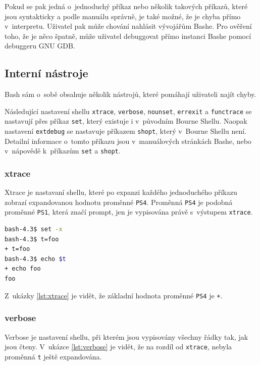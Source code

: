 \documentclass[thesis=M,czech]{FITthesis}[2012/06/26]
\begin{document}
Pokud se pak jedná o~jednoduchý příkaz nebo několik takových příkazů, které jsou syntakticky a podle manuálu správně, je také možné, že je chyba přímo v~interpretu. Uživatel pak může chování nahlásit vývojářům Bashe. Pro ověření toho, že je něco špatně, může uživatel debuggovat přímo instanci Bashe pomocí debuggeru GNU GDB.



%
\subsection{Interní nástroje}

Bash sám o~sobě obsahuje několik nástrojů, které pomáhají uživateli najít chyby.

Následující nastavení shellu \texttt{xtrace}, \texttt{verbose}, \texttt{nounset}, \texttt{errexit} a \texttt{functrace} se nastavují přes příkaz \texttt{set}, který existuje i v~původním Bourne Shellu. Naopak nastavení \texttt{extdebug} se nastavuje příkazem \texttt{shopt}, který v~Bourne Shellu není. Detailní informace o~tomto příkazu jsou v~manuálových stránkách Bashe, nebo v~nápovědě k~příkazům \texttt{set} a \texttt{shopt}.

\subsubsection{xtrace}

Xtrace je nastavaní shellu, které po expanzi každého jednoduchého příkazu zobrazí expandovanou hodnotu proměnné \texttt{PS4}. Proměnná \texttt{PS4} je podobná proměnné \texttt{PS1}, která značí prompt, jen je vypisována právě s~výstupem \texttt{xtrace}.

\noindent
\begin{minipage}{\linewidth}
\begin{lstlisting}[language=bash, caption={Nastavení xtrace}, label={lst:xtrace}]
bash-4.3$ set -x
bash-4.3$ t=foo
+ t=foo
bash-4.3$ echo $t
+ echo foo
foo
\end{lstlisting}
\end{minipage}

Z~ukázky \ref{lst:xtrace} je vidět, že základní hodnota proměnné \texttt{PS4} je \texttt{+}.

\subsubsection{verbose}

Verbose je nastavení shellu, při kterém jsou vypisovány všechny řádky tak, jak jsou čteny. V~ukázce \ref{lst:verbose} je vidět, že na rozdíl od \texttt{xtrace}, nebyla proměnná \texttt{t} ještě expandována.
\end{document}
